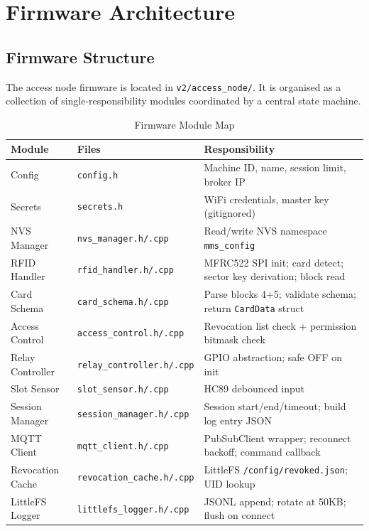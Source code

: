 \chapter{Firmware Architecture}
\label{ch:firmware}

\section{Firmware Structure}

The access node firmware is located in \texttt{v2/access\_node/}. It is organised as a collection of single-responsibility modules coordinated by a central state machine.

\begin{table}[H]
\centering
\caption{Firmware Module Map}
\label{tab:modules}
\begin{tabular}{L{4.5cm}L{4.5cm}L{5.5cm}}
\toprule
\textbf{Module} & \textbf{Files} & \textbf{Responsibility} \\
\midrule
Config & \texttt{config.h} & Machine ID, name, session limit, broker IP \\
Secrets & \texttt{secrets.h} & WiFi credentials, master key (gitignored) \\
NVS Manager & \texttt{nvs\_manager.h/.cpp} & Read/write NVS namespace \texttt{mms\_config} \\
RFID Handler & \texttt{rfid\_handler.h/.cpp} & MFRC522 SPI init; card detect; sector key derivation; block read \\
Card Schema & \texttt{card\_schema.h/.cpp} & Parse blocks 4+5; validate schema; return \texttt{CardData} struct \\
Access Control & \texttt{access\_control.h/.cpp} & Revocation list check + permission bitmask check \\
Relay Controller & \texttt{relay\_controller.h/.cpp} & GPIO abstraction; safe OFF on init \\
Slot Sensor & \texttt{slot\_sensor.h/.cpp} & HC89 debounced input \\
Session Manager & \texttt{session\_manager.h/.cpp} & Session start/end/timeout; build log entry JSON \\
MQTT Client & \texttt{mqtt\_client.h/.cpp} & PubSubClient wrapper; reconnect backoff; command callback \\
Revocation Cache & \texttt{revocation\_cache.h/.cpp} & LittleFS \texttt{/config/revoked.json}; UID lookup \\
LittleFS Logger & \texttt{littlefs\_logger.h/.cpp} & JSONL append; rotate at 50KB; flush on connect \\

\end{tabular}
\end{table}
